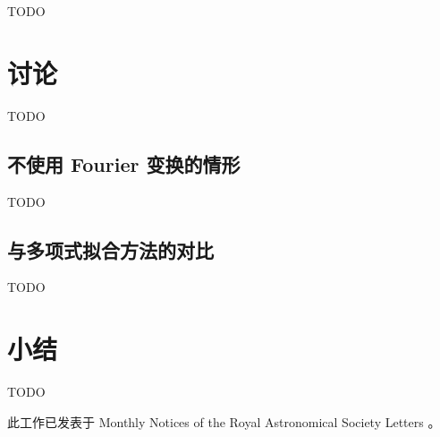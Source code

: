 TODO


\section{讨论}

TODO

\subsection{不使用 Fourier 变换的情形}

TODO

\subsection{与多项式拟合方法的对比}

TODO


\section{小结}

TODO

此工作已发表于 Monthly Notices of the Royal Astronomical Society
Letters \cite{li2018cdae}。


